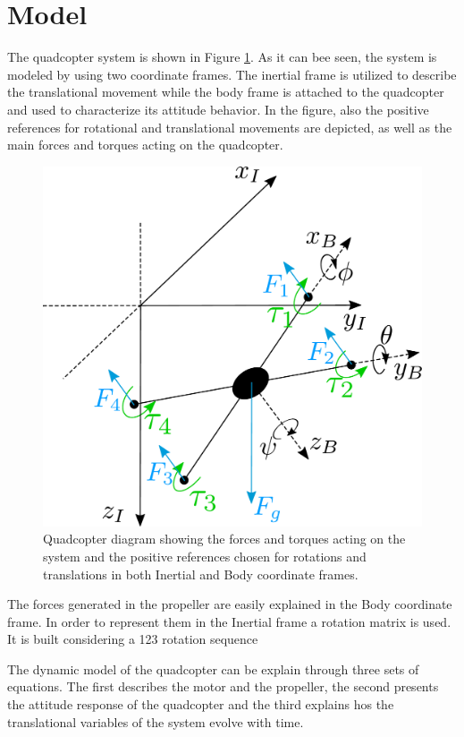 \section{Model}
The quadcopter system is shown in Figure \ref{droneDiagram}. As it can bee seen, the system is modeled by using two coordinate frames. The inertial frame is utilized to describe the translational movement while the body frame is attached to the quadcopter and used to characterize its attitude behavior. In the figure, also the positive references for rotational and translational movements are depicted, as well as the main forces and torques acting on the quadcopter. 
\begin{figure}[H]
	\centering
	\includegraphics[scale=0.3]{figures/droneDiagram}
	\caption{Quadcopter diagram showing the forces and torques acting on the system and the positive references chosen for rotations and translations in both Inertial and Body coordinate frames.}
	\label{droneDiagram}
\end{figure}
The forces generated in the propeller are easily explained in the Body coordinate frame. In order to represent them in the Inertial frame a rotation matrix is used. It is built considering a 123 rotation sequence \cite{rotationmatrix}
 
The dynamic model of the quadcopter can be explain through three sets of equations. The first describes the motor and the propeller, the second presents the attitude response of the quadcopter and the third explains hos the translational variables of the system evolve with time.
